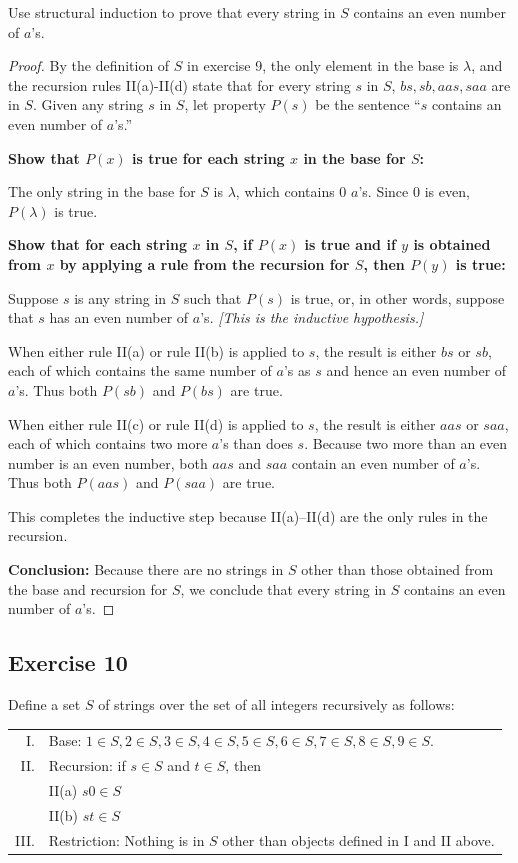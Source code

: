 \documentclass[14pt]{extarticle}
\begin{document}
Use structural induction to prove that every string in $S$ contains an even number of $a$'s.

\begin{proof}
By the definition of $S$ in exercise 9, the only element in the base is $\lambda$, and the recursion rules II(a)-II(d) 
state that for every string $s$ in $S$, $bs, sb, aas, saa$ are in $S$. Given any string $s$ in $S$, 
let property $P(s)$ be the sentence “$s$ contains an even number of $a$'s.” 

{\bf Show that $P(x)$ is true for each string $x$ in the base for $S$:}

The only string in the base for $S$ is $\lambda$, which contains 0 $a$'s. Since 0 is even, $P(\lambda)$ is true. 

{\bf Show that for each string $x$ in $S$, if $P(x)$ is true and if $y$ is obtained from $x$ by applying a rule 
from the recursion for $S$, then $P(y)$ is true:}

Suppose $s$ is any string in $S$ such that $P(s)$ is true, or, in other words, suppose that $s$ has an even number of $a$'s. {\it [This is the inductive hypothesis.]} 

When either rule II(a) or rule II(b) is applied to $s$, the result is either $bs$ or $sb$, each of which contains the 
same number of $a$'s as $s$ and hence an even number of $a$'s. Thus both $P(sb)$ and $P(bs)$ are true.

When either rule II(c) or rule II(d) is applied to $s$, the result is either $aas$ or $saa$, each of which contains two 
more $a$'s than does $s$. Because two more than an even number is an even number, both $aas$ and $saa$ contain an 
even number of $a$’s. Thus both $P(aas)$ and $P(saa)$ are true.

This completes the inductive step because II(a)–II(d) are the only rules in the recursion.

{\bf Conclusion:} Because there are no strings in $S$ other than those obtained from the base and recursion for $S$, we 
conclude that every string in $S$ contains an even number of $a$'s.
\end{proof}

\subsection{Exercise 10}
Define a set $S$ of strings over the set of all integers recursively as follows:

\begin{tabular}{rl}
I. & Base: $1 \in S, 2 \in S, 3 \in S, 4 \in S, 5 \in S, 6 \in S, 7 \in S, 8 \in S, 9 \in S$. \\
II. & Recursion: if $s \in S$ and $t \in S$, then \\
    & II(a) $s0 \in S$ \\
    & II(b) $st \in S$ \\
III. & Restriction: Nothing is in $S$ other than objects defined in I and II above.
\end{tabular}
\end{document}
